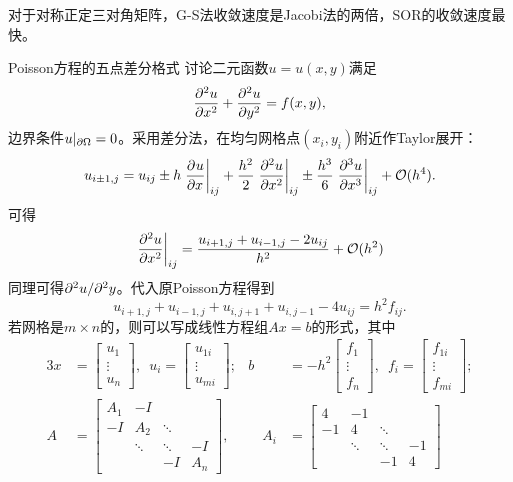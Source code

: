 \begin{remark}
    对于对称正定三对角矩阵，G-S法收敛速度是Jacobi法的两倍，SOR的收敛速度最快。
\end{remark}

\begin{example}
    {Poisson方程的五点差分格式}{}
    讨论二元函数$u=u(x,y)$满足 
    \[
        \pv[2]ux+\pv[2]uy=f(x,y),
    \]
    边界条件$u|_{\p\Omega}=0$。采用差分法，在均匀网格点$(x_i,y_i)$附近作Taylor展开：
    \[
        u_{i\pm 1,j}=u_{ij}\pm h\edg{\pv ux}_{ij}+\frac{h^2}2\edg{\pv[2]ux}_{ij}\pm\frac{h^3}6\edg{\pv[3]ux}_{ij}+\bigo(h^4).
    \]
    可得
    \[
        \edg{\pv[2]ux}_{ij}=\frac{u_{i+1,j}+u_{i-1,j}-2u_{ij}}{h^2}+\bigo(h^2)
    \]
    同理可得$\p^2u/\p^2y$。代入原Poisson方程得到
    \begin{equation}
        u_{i+1,j}+u_{i-1,j}+u_{i,j+1}+u_{i,j-1}-4u_{ij}=h^2f_{ij}.
    \end{equation}
    若网格是$m\times n$的，则可以写成线性方程组$Ax=b$的形式，其中        
    \begin{alignat*}{3}
        x&=\begin{bmatrix}
            u_1\\\vdots\\ u_n
        \end{bmatrix},\enspace u_i=\begin{bmatrix}
            u_{1i}\\\vdots\\u_{mi}
        \end{bmatrix};&
        b&=-h^2\begin{bmatrix}
            f_1\\\vdots\\f_n
        \end{bmatrix},\enspace f_i=\begin{bmatrix}
            f_{1i}\\\vdots\\f_{mi}
        \end{bmatrix};\\
        A&=\begin{bmatrix}
            A_1&-I\\-I&A_2&\ddots\\ &\ddots&\ddots&-I\\ &&-I&A_n
        \end{bmatrix},&\quad A_i&=\begin{bmatrix}
            4&-1\\-1&4&\ddots\\ &\ddots&\ddots&-1\\ &&-1&4

\end{bmatrix}
\end{alignat*}
\end{example}
